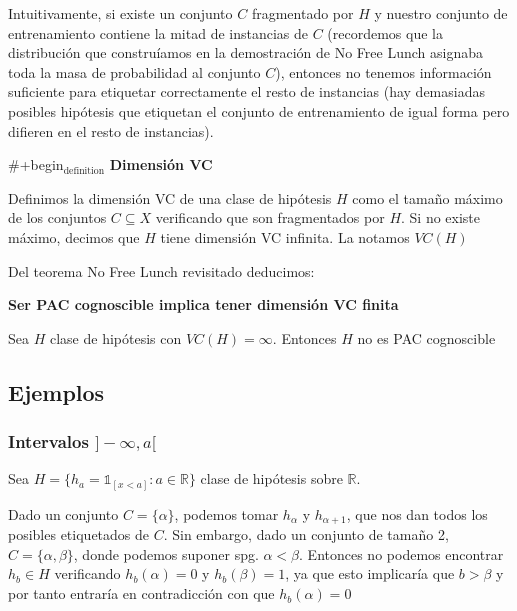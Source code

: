 \begin{definition}
\begin{theorem}
\label{nofreelunch-v2}
\end{theorem}

Intuitivamente, si existe un conjunto $C$ fragmentado por $H$ y nuestro conjunto de entrenamiento contiene la mitad de instancias de $C$ (recordemos que la distribución que construíamos en la demostración de No Free Lunch asignaba toda la masa de probabilidad al conjunto $C$), entonces no tenemos información suficiente para etiquetar correctamente el resto de instancias (hay demasiadas posibles hipótesis que etiquetan el conjunto de entrenamiento de igual forma pero difieren en el resto de instancias).

\#+begin$_{\text{definition}}$
\textbf{Dimensión VC}

Definimos la dimensión VC de una clase de hipótesis $H$ como el tamaño máximo de los conjuntos $C \subseteq X$ verificando que son fragmentados por $H$. Si no existe máximo, decimos que $H$ tiene dimensión VC infinita. La notamos $VC(H)$
\end{definition}


Del teorema No Free Lunch revisitado deducimos:

\begin{theorem}
\textbf{Ser PAC cognoscible implica tener dimensión VC finita}

Sea $H$ clase de hipótesis con $VC(H) = \infty$. Entonces $H$ no es PAC cognoscible
\end{theorem}

\subsection{Ejemplos}

\subsubsection{Intervalos $]-\infty, a[$}

Sea $H = \{h_a = \mathds{1}_[x<a]: a\in \mathbb{R}\}$ clase de hipótesis sobre $\mathbb{R}$. 

Dado un conjunto $C=\{\alpha\}$, podemos tomar $h_{\alpha}$ y $h_{\alpha+1}$, que nos dan todos los posibles etiquetados de $C$.
Sin embargo, dado un conjunto de tamaño 2, $C=\{\alpha, \beta\}$, donde podemos suponer spg. $\alpha < \beta$. Entonces no podemos encontrar $h_b \in H$ verificando $h_b(\alpha)=0$ y $h_b(\beta) = 1$, ya que esto implicaría que $b > \beta$ y por tanto entraría en contradicción con que $h_b(\alpha) = 0$

